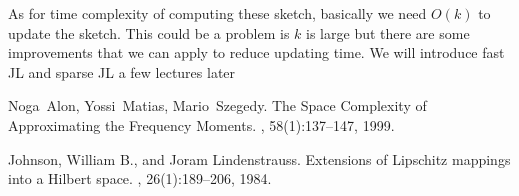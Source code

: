 \documentclass[11pt]{article}
\begin{document}
As for time complexity of computing these sketch, basically we need $O(k)$ to update the sketch. This could be a problem is $k$ is large but there are some improvements that we can apply to reduce updating time. We will introduce fast JL and sparse JL a few lectures later 




\begin{thebibliography}{42}

Noga~Alon, Yossi~Matias, Mario~Szegedy.
\newblock The Space Complexity of Approximating the Frequency Moments.
, 58(1):137--147, 1999.

Johnson, William B., and Joram Lindenstrauss. 
\newblock Extensions of Lipschitz mappings into a Hilbert space.
, 26(1):189--206, 1984.

\end{thebibliography}
\end{document}

